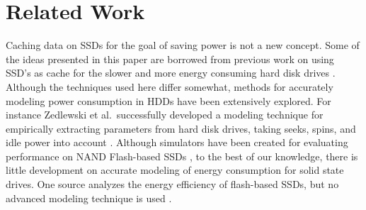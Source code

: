 \section{Related Work}
\label{sec:related}

Caching data on SSDs for the goal of saving power is not a new concept. Some of
the ideas presented in this paper are borrowed from previous work on using SSD's
as cache for the slower and more energy consuming hard disk drives
\cite{flash-disk-hybrid}. Although the techniques used here differ somewhat,
methods for accurately modeling power consumption in HDDs have been extensively
explored. For instance Zedlewski et al.\ successfully developed a modeling
technique for empirically extracting parameters from hard disk drives, taking
seeks, spins, and idle power into account \cite{hard-disk-power}. Although
simulators have been created for evaluating performance on NAND Flash-based SSDs
\cite{flashsim}, to the best of our knowledge, there is little development on
accurate modeling of energy consumption for solid state drives. One source
analyzes the energy efficiency of flash-based SSDs, but no advanced modeling
technique is used \cite{ssd-energy-efficiency}.
